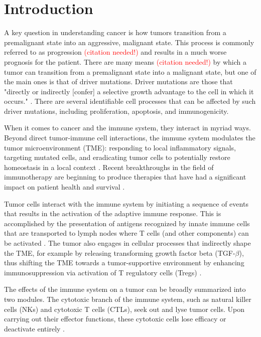 \documentclass[11pt]{article}
\newcommand{\tcr} { \textcolor{red} }
\begin{document}
\section{Introduction}
A key question in understanding cancer is how tumors transition from a premalignant state into an aggressive, malignant state.
This process is commonly referred to as progression \tcr{(citation needed!)} and results in a much worse prognosis for the patient.
There are many means \tcr{(citation needed!)} by which a tumor can transition from a premalignant state into a malignant state, but one of the main ones is that of driver mutations.
Driver mutations are those that "directly or indirectly [confer] a selective growth advantage to the cell in which it occurs." \cite{ryan2016hallmarks}.
There are several identifiable cell processes that can be affected by such driver mutations, including proliferation, apoptosis, and immunogenicity.
\par
When it comes to cancer and the immune system, they interact in myriad ways.
Beyond direct tumor-immune cell interactions, the immune system modulates the tumor microenvironment (TME): responding to local inflammatory signals, targeting mutated cells, and eradicating tumor cells to potentially restore homeostasis in a local context \cite{de2006paradoxical}.
Recent breakthroughs in the field of immunotherapy are beginning to produce therapies that have had a significant impact on patient health and survival \cite{pardoll2012blockade,restifo2012adoptive}.
\par 
Tumor cells interact with the immune system by initiating a sequence of events that results in the activation of the adaptive immune response. This is accomplished by the presentation of antigens recognized by innate immune cells that are transported to lymph nodes where T cells (and other components) can be activated \cite{schreiber11_cancer}. The tumor also engages in cellular processes that indirectly shape the TME, for example by releasing transforming growth factor beta (TGF-$\beta$), thus shifting the TME towards a tumor-supportive environment by enhancing immunosuppression via activation of T regulatory cells (Tregs) \cite{schreiber11_cancer}.
\par
The effects of the immune system on a tumor can be broadly summarized into two modules. The cytotoxic branch of the immune system, such as natural killer cells (NKs) and cytotoxic T cells (CTLs), seek out and lyse tumor cells.
Upon carrying out their effector functions, these cytotoxic cells lose efficacy or deactivate entirely \cite{finn12_immunooncology-1}.
\end{document}
